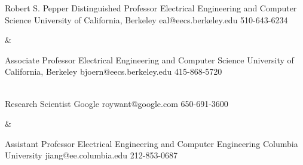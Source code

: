 
\begin{cvreferences}
  {Robert S. Pepper Distinguished Professor}
  {Electrical Engineering and Computer Science}
  {University of California, Berkeley}
  {eal@eecs.berkeley.edu}
  {510-643-6234}

  &

  {Associate Professor}
  {Electrical Engineering and Computer Science}
  {University of California, Berkeley}
  {bjoern@eecs.berkeley.edu}
  {415-868-5720}

  \\

  {Research Scientist}
  {}
  {Google}
  {roywant@google.com}
  {650-691-3600}

  &

  {Assistant Professor}
  {Electrical Engineering and Computer Engineering}
  {Columbia University}
  {jiang@ee.columbia.edu}
  {212-853-0687}

  \\
\end{cvreferences}

